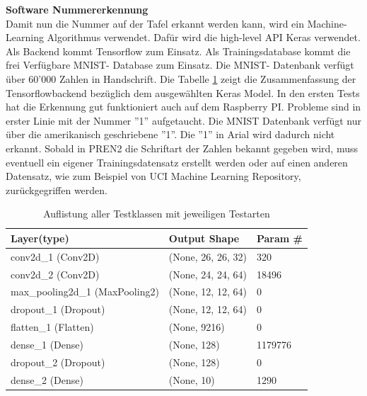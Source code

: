 \documentclass[../../main.tex]{subfiles}
\begin{document}
    \textbf{Software Nummererkennung}\\
    Damit nun die Nummer auf der Tafel erkannt werden kann, wird ein Machine-Learning Algorithmus verwendet. Dafür wird die high-level API Keras verwendet. Als Backend kommt Tensorflow zum Einsatz. Als Trainingsdatabase kommt die frei Verfügbare MNIST- Database zum Einsatz. Die MNIST- Datenbank verfügt über 60'000 Zahlen in Handschrift. Die Tabelle \ref{tab:Testklassen} zeigt die Zusammenfassung der Tensorflowbackend bezüglich dem ausgewählten Keras Model. In den ersten Tests hat die Erkennung gut funktioniert auch auf dem Raspberry PI. Probleme sind in erster Linie mit der Nummer ''1'' aufgetaucht. Die MNIST Datenbank verfügt nur über die amerikanisch geschriebene ''1''. Die ''1'' in Arial wird dadurch nicht erkannt. Sobald in PREN2 die Schriftart der Zahlen bekannt gegeben wird, muss eventuell ein eigener Trainingsdatensatz erstellt werden oder auf einen anderen Datensatz, wie zum Beispiel von UCI Machine Learning Repository, zurückgegriffen werden.
    \begin{table}[H]
            \begin{center}
                \begin{tabular}{ | l | l | p{3cm} |}
                \hline
                \textbf{Layer(type)}  & \textbf{Output Shape} & \textbf{Param \#}\\\hline
                conv2d\_1 (Conv2D) & (None, 26, 26, 32) & 320 \\\hline
                conv2d\_2 (Conv2D) & (None, 24, 24, 64) & 18496 \\ \hline
                max\_pooling2d\_1 (MaxPooling2) & (None, 12, 12, 64) & 0\\ \hline
                dropout\_1 (Dropout) & (None, 12, 12, 64) & 0 \\ \hline
                flatten\_1 (Flatten) & (None, 9216) & 0 \\ \hline
                dense\_1 (Dense) & (None, 128) & 1179776 \\ \hline
                dropout\_2 (Dropout)  & (None, 128) & 0 \\ \hline
                dense\_2 (Dense)  & (None, 10) & 1290 \\ \hline
                \end{tabular}
            \end{center}
            \caption{Auflistung aller Testklassen mit jeweiligen Testarten}
            \label{tab:Testklassen}
        \end{table}
\end{document}
